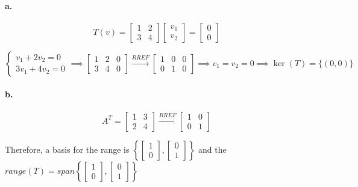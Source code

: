 \documentclass{report}
\begin{document}
\paragraph{a.}

$$
T(v) = \begin{bmatrix} 1 & 2 \\ 3 & 4 \end{bmatrix} \begin{bmatrix} v_1 \\ v_2 \end{bmatrix} = \begin{bmatrix} 0 \\ 0 \end{bmatrix} 
$$

$$
\begin{cases}
	v_1 + 2v_2 = 0 \\ 3v_1  + 4v_2 = 0 
\end{cases} \implies \begin{bmatrix} 1 &2 & 0 \\ 3 & 4 & 0 \end{bmatrix} \xrightarrow{RREF} \begin{bmatrix} 1 & 0 & 0 \\ 0 & 1 & 0 \end{bmatrix} \implies v_1 = v_2 = 0 \implies \ker(T) = \{ (0,0)\}
$$

\paragraph{b.} 

$$
A^T = \begin{bmatrix} 1 & 3 \\ 2 & 4 \end{bmatrix} \xrightarrow{RREF} \begin{bmatrix} 1 & 0 \\ 0 & 1 \end{bmatrix} 
$$

\noindent Therefore, a basis for the range is $\left\{\begin{bmatrix} 1 \\ 0 \end{bmatrix} , \begin{bmatrix} 0 \\ 1 \end{bmatrix}\right\}$ and the $range(T) = span \left\{ \begin{bmatrix}  1 \\ 0 \end{bmatrix}, \begin{bmatrix} 0 \\ 1 \end{bmatrix}\right\}$
\end{document}
